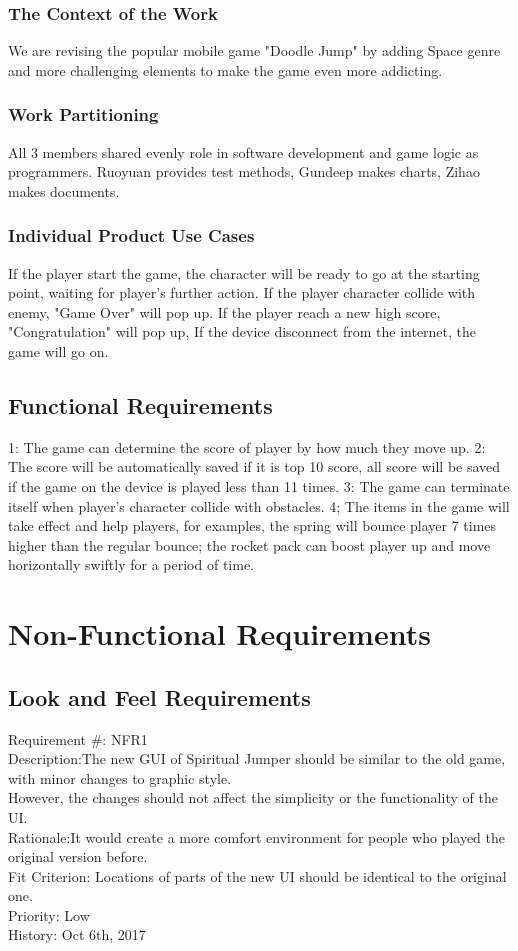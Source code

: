 \documentclass[12pt, titlepage]{article}
\begin{document}
\subsubsection{The Context of the Work}
We are revising the popular mobile game "Doodle Jump" by adding Space  genre and more challenging elements to make the game even more addicting.

\subsubsection{Work Partitioning}
All 3 members shared evenly role in software development and game logic as programmers. Ruoyuan provides test methods, Gundeep makes charts, Zihao makes documents.

\subsubsection{Individual Product Use Cases}
If the player start the game, the character will be ready to go at the starting point, waiting for player's further action.
If the player character collide with enemy, "Game Over" will pop up.
If the player reach a new high score, "Congratulation" will pop up,
If the device disconnect from the internet, the game will go on.


\subsection{Functional Requirements}
1: The game can determine the score of player by how much they move up.
2: The score will be automatically saved if it is top 10 score, all score will be saved if the game on the device is played less than 11 times.
3: The game can terminate itself when player's character collide with obstacles.
4; The items in the game will take effect and help players, for examples, the spring will bounce player 7 times higher than the regular bounce;  the rocket pack can boost player up and move horizontally swiftly for a period of time.

\section{Non-Functional Requirements}

\subsection{Look and Feel Requirements}
Requirement \#: NFR1\\
Description:The new GUI of Spiritual Jumper should be similar to the old game, with minor changes to graphic style.\\ However, the changes should not affect the simplicity or the functionality of the UI.\\
Rationale:It would create a more comfort environment for people who played the original version before.\\
Fit Criterion: Locations of parts of the new UI should be identical to the original one.\\
Priority: Low\\
History: Oct 6th, 2017\\
\end{document}
